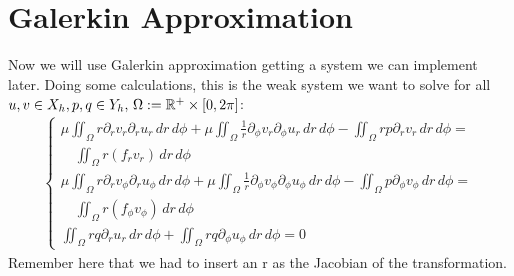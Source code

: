 \documentclass[12pt,a4paper]{report}
\begin{document}
\section{Galerkin Approximation}
Now we will use Galerkin approximation getting a system we can implement later. Doing some calculations, this is the weak system we want to solve for all \( u,v \in X_h, \\p,q \in Y_h,\, \Omega := \mathbb{R}^+ \times [0,2\pi]\):\\
\begin{gather}
\begin{cases}
    \mu \iint_{\Omega} r \partial_r v_r \partial_r u_r \, dr\,d\phi + \mu \iint_{\Omega} \frac{1}{r} \partial_{\phi} v_r \partial_{\phi} u_r \, dr\,d\phi - \iint_{\Omega} rp \partial_r v_r \, dr\,d\phi =\\
    \quad \iint_{\Omega} r(f_r v_r) \, dr\,d\phi\\
    \mu \iint_{\Omega} r \partial_r v_{\phi} \partial_r u_{\phi} \, dr\,d\phi + \mu \iint_{\Omega} \frac{1}{r} \partial_{\phi} v_{\phi} \partial_{\phi} u_{\phi} \, dr\,d\phi - \iint_{\Omega} p \partial_{\phi} v_{\phi} \, dr\,d\phi =\\
    \quad \iint_{\Omega} r(f_{\phi} v_{\phi}) \, dr\,d\phi\\
    \iint_{\Omega} rq\partial_r u_r \, dr\,d\phi + \iint_{\Omega} rq\partial_{\phi} u_{\phi} \, dr\,d\phi = 0
\end{cases}
\end{gather}
Remember here that we had to insert an r as the Jacobian of the transformation.\\
\end{document}
